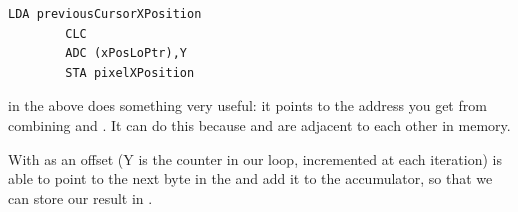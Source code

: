 \begin{lstlisting}[basicstyle=\ttfamily\scriptsize]
        LDA previousCursorXPosition
        CLC 
        ADC (xPosLoPtr),Y
        STA pixelXPosition
\end{lstlisting}

 in the above does something very useful: it points to the address you get from combining
  and  . It can do this because 
and  are adjacent to each other in memory.

With  as an offset  (Y is the counter in our loop,
incremented at each iteration)  is able to point to the next byte in the  and add it to
the accumulator, so that we can store our result in .
 
\clearpage

